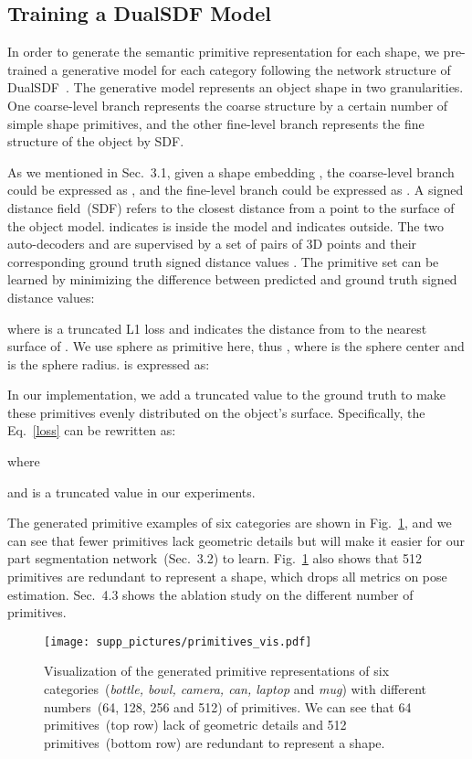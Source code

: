 \documentclass{article}
\begin{document}
\subsection{Training a DualSDF Model}
\label{supp:sec:dualsdf}
In order to generate the semantic primitive representation for each shape, we pre-trained a generative model for each category following the network structure of DualSDF~\cite{DualSDF}.
The generative model represents an object shape in two granularities. One coarse-level branch represents the coarse structure by a certain number of simple shape primitives, and the other fine-level branch represents the fine structure of the object by SDF. 

As we mentioned in Sec.~3.1, given a shape embedding , the coarse-level branch could be expressed as , and the fine-level branch could be expressed as . A signed distance field~(SDF) refers to the closest distance from a point  to the surface of the object model.  indicates  is inside the model and  indicates outside. 
The two auto-decoders  and  are supervised by a set of pairs of 3D points  and their corresponding ground truth signed distance values . The primitive set  can be learned by minimizing the difference between predicted and ground truth signed distance values:

where  is a truncated L1 loss and  indicates the distance from  to the nearest surface of . We use sphere as primitive here, thus , where  is the sphere center and  is the sphere radius.  is expressed as:

In our implementation, we add a truncated value to the ground truth  to make these primitives evenly distributed on the object's surface. Specifically, the Eq.~\ref{loss} can be rewritten as:

where


and  is a truncated value in our experiments. 

The generated primitive examples of six categories are shown in Fig.~\ref{fig:primitives}, and we can see that fewer primitives lack geometric details but will make it easier for our part segmentation network~(Sec.~3.2) to learn. 
Fig.~\ref{fig:primitives} also shows that 512 primitives are redundant to represent a shape, which drops all metrics on pose estimation. Sec.~4.3 shows the ablation study on the different number of primitives.

\begin{figure}
    \centering
    \texttt{[image: supp\_pictures/primitives\_vis.pdf]}
    \caption{Visualization of the generated primitive representations of six categories~(\emph{bottle, bowl, camera, can, laptop} and \emph{mug}) with different numbers~(64, 128, 256 and 512) of primitives. We can see that 64 primitives~(top row) lack of geometric details and 512 primitives~(bottom row) are redundant to represent a shape.}
    \label{fig:primitives}
\end{figure} \setcounter{section}{1}
\end{document}
